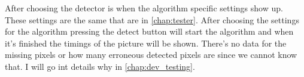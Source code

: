After choosing the detector is when the algorithm specific settings show up. These settings are the same that are in \autoref{chap:tester}. After choosing the settings for the algorithm pressing the detect button will start the algorithm and when it's finished the timings of the picture will be shown. There's no data for the missing pixels or how many erroneous detected pixels are since we cannot know that. I will go int details why in \autoref{chap:dev_testing}.